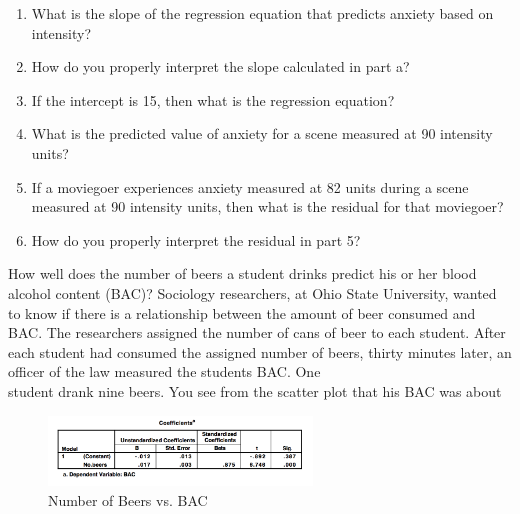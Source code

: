 \documentclass[11pt, chapterprefix=true]{scrbook}\usepackage[]{graphicx}\usepackage[]{color}
\begin{document}
\begin{exercises}
\begin{exercise}
\begin{enumerate}
  \item What is the slope of the regression equation that predicts anxiety based on intensity?
  \item	How do you properly interpret the slope calculated in part a?
  \item	If the intercept is 15, then what is the regression equation?
  \item	What is the predicted value of anxiety for a scene measured at 90 intensity \\ units?
  \item	If a moviegoer experiences anxiety measured at 82 units during a scene measured at 90 intensity units, then what is the residual for that moviegoer?
  \item	How do you properly interpret the residual in part 5?
\end{enumerate}

\end{exercise}
\begin{solution}

\end{solution}


 \begin{exercise} %


    How well does the number of beers a student drinks predict his or her
blood alcohol content (BAC)? Sociology researchers, at Ohio State University, wanted to know if there is a relationship between the amount of beer consumed and BAC. The researchers assigned the number of cans of beer to each student. After each student had consumed the assigned number of beers,  thirty minutes later, an officer of the law measured the students BAC. \cite{OSU2016}
One \\ student drank nine beers. You see from the scatter plot that his BAC was about

\begin{figure}[htbp] %
   \centering
   \includegraphics[width=7cm]{chapters/Chapter_14/ext_figure/zRegF.png}
   \caption{Number of Beers vs. BAC}
   \label{fig:f12_11}
\end{figure}



\end{exercise}
\end{exercises}
\end{document}
